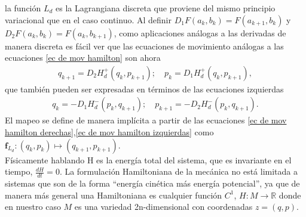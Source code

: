 la función $L_{d}$ es la Lagrangiana discreta que proviene del mismo principio variacional que en el caso continuo. Al definir $D_{1}F(a_{k},b_{k})=F(a_{k+1},b_{k})$ y  $D_{2}F(a_{k},b_{k})=F(a_{k},b_{k+1})$, como aplicaciones análogas a las derivadas de manera discreta  es fácil ver que las ecuaciones de movimiento análogas a las ecuaciones \ref{ec de mov hamilton} son ahora
\begin{eqnarray}
q_{k+1}=D_{2}H_{d}^{+}(q_{k},p_{k+1}); \quad p_{k}=D_{1}H_{d}^{+}(q_{k},p_{k+1}),
\label{ec de mov hamilton derechas}
\end{eqnarray}
que también pueden ser expresadas en términos de las ecuaciones izquierdas 
\begin{eqnarray}
q_{k}=-D_{1}H_{d}^{-}(p_{k},q_{k+1}); \quad p_{k+1}=-D_{2}H_{d}^{-}(p_{k},q_{k+1}).
\label{ec de mov hamilton izquierdas}
\end{eqnarray}
El mapeo se define de manera implícita a partir de las ecuaciones \ref{ec de mov hamilton derechas},\ref{ec de mov hamilton izquierdas} como $\mathbf{f}_{L_{d}}:(q_{k},p_{k})\mapsto(q_{k+1},p_{k+1})$.\\

Físicamente hablando H es la energía total del sistema, que es invariante en el tiempo, $\frac{dH}{dt}=0$. La formulación Hamiltoniana de la mecánica no está limitada a sistemas que son de la forma  ``energía cinética más energía potencial'', ya que de manera más general una Hamiltoniana es cualquier función $C^{1}$, $H:M\rightarrow \mathbb{R}$ donde en nuestro caso $M$ es una variedad 2n-dimensional con coordenadas  $z=(q,p)$. 




